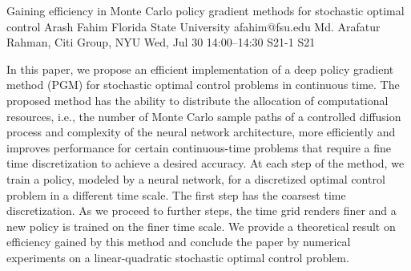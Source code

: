 \begin{talk}
  {Gaining efficiency in Monte Carlo policy gradient methods for stochastic optimal control}%
  {Arash Fahim}%
  {Florida State University}%
  {afahim@fsu.edu}%
  {Md. Arafatur Rahman, Citi Group, NYU}%
  {}%
  {Wed, Jul 30 14:00--14:30}%
  {S21-1}%
  {S21}%
  
    
   
In this paper, we propose an efficient implementation of a deep policy gradient method (PGM) for stochastic optimal control problems in continuous time. The proposed method has the ability to distribute the allocation of computational resources, i.e., the number of Monte Carlo  sample paths of a controlled diffusion process and complexity of the neural network architecture, more efficiently and improves performance for certain continuous-time problems that require a fine time discretization to achieve a desired accuracy. At each step of the method, we train a policy, modeled by a neural network, for a discretized optimal control problem in a different time scale. The first step has the coarsest time discretization. As we proceed to further steps, the time grid renders finer and a new policy is trained on the finer time scale. We provide a theoretical result on efficiency gained by this method and conclude the paper by numerical experiments on a linear-quadratic stochastic optimal control problem.

\medskip


\end{talk}

